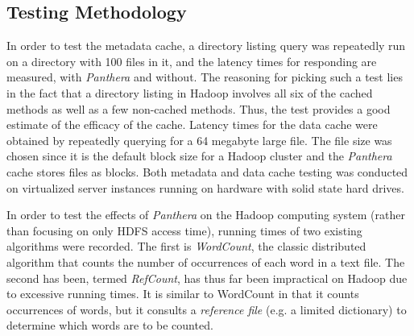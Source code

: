 \documentclass[12pt]{article}
\begin{document}
\subsection{Testing Methodology}
In order to test the metadata cache, a directory listing query was repeatedly run on a directory with 100 files in it, and the latency times for responding are measured, with \textit{Panthera} and without. The reasoning for picking such a test lies in the fact that a directory listing in Hadoop involves all six of the cached methods as well as a few non-cached methods. Thus, the test provides a good estimate of the efficacy of the cache. Latency times for the data cache were obtained by repeatedly querying for a 64 megabyte large file. The file size was chosen since it is the default block size for a Hadoop cluster and the \textit{Panthera} cache stores files as blocks. Both metadata and data cache testing was conducted on virtualized server instances running on hardware with solid state hard drives. 

In order to test the effects of \textit{Panthera} on the Hadoop computing system (rather than focusing on only HDFS access time), running times of two existing algorithms were recorded. The first is \textit{WordCount}, the classic distributed algorithm that counts the number of occurrences of each word in a text file. The second has been, termed \textit{RefCount}, has thus far been impractical on Hadoop due to excessive running times. It is similar to WordCount in that it counts occurrences of words, but it consults a \textit{reference file} (e.g. a limited dictionary) to determine which words are to be counted.
\end{document}
